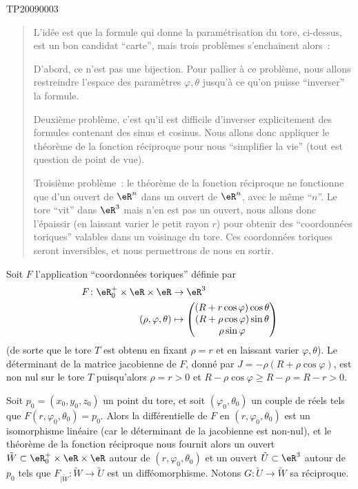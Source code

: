 \begin{corrige}{TP20090003}
\begin{quote}
  L'idée est que la formule qui donne la paramétrisation du tore,
  ci-dessus, est un bon candidat ``carte'', mais trois problèmes
  s'enchainent alors~:

  D'abord, ce n'est pas une bijection. Pour pallier à ce problème,
  nous allons restreindre l'espace des paramètres $\varphi,\theta$
  jusqu'à ce qu'on puisse ``inverser'' la formule.

  Deuxième problème, c'est qu'il est difficile d'inverser
  explicitement des formules contenant des sinus et cosinus. Nous
  allons donc appliquer le théorème de la fonction réciproque pour
  nous ``simplifier la vie'' (tout est question de point de vue).

  Troisième problème~: le théorème de la fonction réciproque ne
  fonctionne que d'un ouvert de $\eR^n$ dans un ouvert de $\eR^n$,
  avec le même ``$n$''. Le tore ``vit'' dans $\eR^3$ mais n'en est pas un
  ouvert, nous allons donc l'épaissir (en laissant varier le petit
  rayon $r$) pour obtenir des ``coordonnées toriques'' valables dans
  un voisinage du tore. Ces coordonnées toriques seront inversibles,
  et nous permettrons de nous en sortir.
\end{quote}

Soit $F$ l'application ``coordonnées toriques'' définie par
\begin{equation}
	\begin{aligned}
		F\colon \eR_0^+\times\eR\times\eR&\to \eR^3 \\
		(\rho,\varphi,\theta)&\mapsto \begin{pmatrix}
			(R+r\cos\varphi)\cos\theta	\\ 
			(R+\rho\cos\varphi)\sin\theta	\\ 
			\rho\sin\varphi	
		\end{pmatrix}
	\end{aligned}
\end{equation}
(de sorte que le tore $T$ est obtenu en fixant $\rho = r$ et en
laissant varier $\varphi,\theta$).  Le déterminant de la matrice
jacobienne de $F$, donné par $J = -\rho (R+\rho \cos \varphi)$, est
non nul sur le tore $T$ puisqu'alors $\rho = r > 0$ et $R - \rho
\cos\varphi \geq R - \rho = R - r > 0$.

Soit $p_0 = (x_0,y_0,z_0)$ un point du tore, et soit $(\varphi_0,
\theta_0)$ un couple de réels tels que $F(r, \varphi_0, \theta_0) =
p_0$. Alors la différentielle de $F$ en $(r, \varphi_0, \theta_0)$ est un
isomorphisme linéaire (car le déterminant de la jacobienne est
non-nul), et le théorème de la fonction réciproque nous fournit alors
un ouvert $\tilde W \subset \eR^+_0 \times \eR \times \eR$ autour de
$(r, \varphi_0, \theta_0)$ et un ouvert $\tilde U \subset \eR^3$ autour
de $p_0$ tels que $F_{| \tilde W} : \tilde W \to \tilde U$ est un
difféomorphisme. Notons $G : \tilde U \to \tilde W$ sa réciproque.


\end{corrige}
